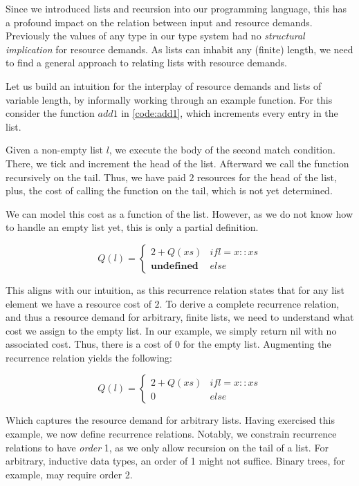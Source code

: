 Since we introduced lists and recursion into our programming language, this has a profound impact on the relation between input and resource demands. Previously the values of any type in our type system had no \emph{structural implication} for resource demands. As lists can inhabit any (finite) length, we need to find a general approach to relating lists with resource demands. 

Let us build an intuition for the interplay of resource demands and lists of variable length, by informally working through an example function. For this consider the function \(add1\) in \cref{code:add1}, which increments every entry in the list.

Given a non-empty list \(l\), we execute the body of the second match condition. There, we tick and increment the head of the list. Afterward we call the function recursively on the tail. Thus, we have paid \(2\) resources for the head of the list, plus, the cost of calling the function on the tail, which is not yet determined.

We can model this cost as a function of the list. However, as we do not know how to handle an empty list yet, this is only a partial definition.

\[
   Q(l) = \begin{cases*}
      2 + Q(xs)            & if l = x :: xs\\
      \textbf{undefined}   & else
   \end{cases*}
\]

This aligns with our intuition, as this recurrence relation states that for any list element we have a resource cost of \(2\). To derive a complete recurrence relation, and thus a resource demand for arbitrary, finite lists, we need to understand what cost we assign to the empty list. In our example, we simply return nil with no associated cost. Thus, there is a cost of \(0\) for the empty list. Augmenting the recurrence relation yields the following:

\[
   Q(l) = \begin{cases*}
      2 + Q(xs)            & if l = x :: xs\\
      0                    & else
   \end{cases*}
\]

Which captures the resource demand for arbitrary lists. Having exercised this example, we now define recurrence relations. Notably, we constrain recurrence relations to have \emph{order} 1, as we only allow recursion on the tail of a list. For arbitrary, inductive data types, an order of 1 might not suffice. Binary trees, for example, may require order 2.

